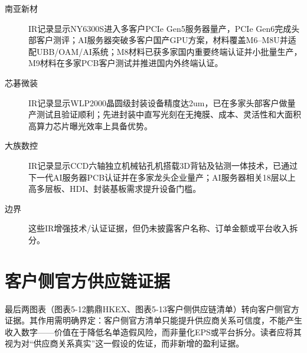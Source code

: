 \begin{exhibitbox}[图表5-11：观察名单IR技术与客户验证刷新]
\footnotesize
\begin{description}
  \item[南亚新材] IR记录显示NY6300S进入多客户PCIe Gen5服务器量产，PCIe Gen6完成头部客户测评；AI服务器突破多客户国产GPU方案，材料覆盖M6--M8U并适配UBB/OAM/AI系统；M8材料已获多家国内重要终端认证并小批量生产，M9材料在多家PCB客户测试并推进国内外终端认证。
  \item[芯碁微装] IR记录显示WLP2000晶圆级封装设备精度达2um，已在多家头部客户做量产测试且验证顺利；先进封装中直写光刻在无掩膜、成本、灵活性和大面积高算力芯片曝光效率上具备优势。
  \item[大族数控] IR记录显示CCD六轴独立机械钻孔机搭载3D背钻及钻测一体技术，已通过下一代AI服务器PCB认证并在多家龙头企业量产；AI服务器相关18层以上高多层板、HDI、封装基板需求提升设备门槛。
  \item[边界] 这些IR增强技术/认证证据，但仍未披露客户名称、订单金额或平台收入拆分。
\end{description}
\end{exhibitbox}

\section{客户侧官方供应链证据}

最后两图表（图表5-12鹏鼎HKEX、图表5-13客户侧供应链清单）转向客户侧官方证据。其作用需明确界定：客户侧官方清单只能提升供应商关系可信度，不能产生收入数字——价值在于降低名单造假风险，而非量化EPS或平台拆分。读者应将其视为对``供应商关系真实''这一假设的佐证，而非新增的盈利证据。

